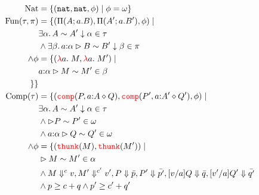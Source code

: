 \begin{align*}
  \text{Nat} &= \{(\nat,\nat,\phi) \mid \phi = \omega\}\\
  \iffalse
  \text{Pot}(\tau,\pi) &= 
    \{(\relpotty{A}{a}{B}, \relpotty{A'}{a}{B'}, \phi) \mid &\\
    &\exists \alpha.\, \sameType{A}{A'}{\alpha}{\tau} \\
    &\land\exists \beta.\, \sameTypeOne{a}{\alpha}{B}{B'}{\beta}{\pi} \\
    &\land \phi = \kappa(\alpha,a.\beta)
    \}\\
    \fi
  \text{Fun}(\tau, \pi) &=
  \{(\arrabt{A}{a.B}{R}, \arrabt{A'}{a.B'}{R'}, \phi) 
  \mid & \\
  &\exists \alpha.\, \sameType{A}{A'}{\alpha}{\tau} \\
  &\land\exists \beta.\, \sameTypeOne{a}{\alpha}{B}{B'}{\beta}{\pi} \\
  \iffalse
  &\land R \sim R' \in \kappa(\alpha, a.\beta)\\
  \fi
  \land\phi &= \{(\lam{a}{\_}{M}, \lam{a}{}{M'}) \mid \\
  &\sameComp{\isOf{a}{\alpha}}{M}{M'}{\beta}\\
  \iffalse
  &\land \fequiv{\cost{a.M}}{\cost{a.M'}}\\
  &\land \eval{R}{\relpot{a}{P}{a.b}{Q}}, \eval{R'}{\relpot{a}{P'}{a.b}{Q'}}\\
  &\land \widehat{a.P} \succeq \cost{a.M} + \{(v, \widehat{a.Q}(v,\widehat{a.M}(v))) \mid \forall v.\, \alpha(v,v)\}\\
  &\land \widehat{a.P'} \succeq \cost{a.M'} + \{(v, \widehat{a.Q'}(v,\widehat{a.M'}(v))) \mid \forall v.\, \alpha(v,v)\}
  \fi
   \}
  \}\\
  \text{Comp}(\tau) &= \{
  (\ccomp{P}{\isOf{a}{A}}{Q}, \ccomp{P'}{\isOf{a}{A'}}{Q'}, \phi) \mid \\
  &\exists \alpha.\, \sameType{A}{A'}{\alpha}{\tau}\\
  &\land \sameComp{}{P}{P'}{\omega}\\ 
  &\land \sameComp{\isOf{a}{\alpha}}{Q}{Q'}{\omega}\\
  \land\phi &= \{(\thunk{M}, \thunk{M'}) \mid \\
  &\sameComp{}{M}{M'}{\alpha}\\
  &\land \evalCost{M}{c}{v}, \evalCost{M'}{c'}{v'}, \eval{P}{\bar{p}},  
    \eval{P'}{\bar{p'}}, \eval{[v/a]Q}{\bar{q}}, \eval{[v'/a]Q'}{\bar{q'}}\\
  &\land p \ge c + q \land p' \ge c' + q'\\

\end{align*}
